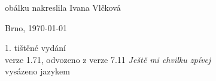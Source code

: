 \vspace*{\fill}
\hspace{10mm}obálku nakreslila Ivana Vlčková\\
\begin{otherlanguage}{czech}
Brno, \today\\
\end{otherlanguage}
1. tištěné vydání\\
verze 1.71, odvozeno z verze 7.11 \textit{Ještě mi chvilku zpívej}\\
vysázeno jazykem \LaTeXe
\vspace{2cm}
\newpage
